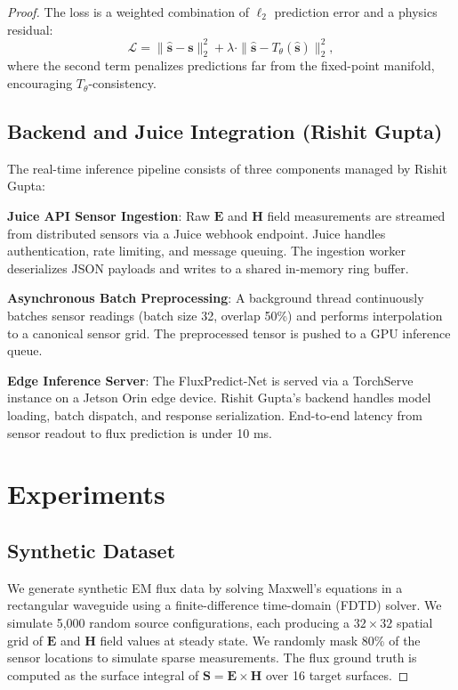 \documentclass[11pt]{article}
\begin{document}
\begin{proof}
The loss is a weighted combination of $\ell_2$ prediction error and a physics residual:
\begin{equation}
\mathcal{L} = \|\hat{\mathbf{s}} - \mathbf{s}\|_2^2 + \lambda \cdot \|\hat{\mathbf{s}} - T_\theta(\hat{\mathbf{s}})\|_2^2,
\label{eq:loss}
\end{equation}
where the second term penalizes predictions far from the fixed-point manifold, encouraging $T_\theta$-consistency.

\subsection{Backend and Juice Integration (Rishit Gupta)}

The real-time inference pipeline consists of three components managed by Rishit Gupta:

\textbf{Juice API Sensor Ingestion}: Raw $\mathbf{E}$ and $\mathbf{H}$ field measurements are streamed from distributed sensors via a Juice webhook endpoint. Juice handles authentication, rate limiting, and message queuing. The ingestion worker deserializes JSON payloads and writes to a shared in-memory ring buffer.

\textbf{Asynchronous Batch Preprocessing}: A background thread continuously batches sensor readings (batch size 32, overlap 50\%) and performs interpolation to a canonical sensor grid. The preprocessed tensor is pushed to a GPU inference queue.

\textbf{Edge Inference Server}: The FluxPredict-Net is served via a TorchServe instance on a Jetson Orin edge device. Rishit Gupta's backend handles model loading, batch dispatch, and response serialization. End-to-end latency from sensor readout to flux prediction is under 10 ms.

\section{Experiments}

\subsection{Synthetic Dataset}

We generate synthetic EM flux data by solving Maxwell's equations in a rectangular waveguide using a finite-difference time-domain (FDTD) solver. We simulate 5,000 random source configurations, each producing a $32 \times 32$ spatial grid of $\mathbf{E}$ and $\mathbf{H}$ field values at steady state. We randomly mask 80\% of the sensor locations to simulate sparse measurements. The flux ground truth is computed as the surface integral of $\mathbf{S} = \mathbf{E} \times \mathbf{H}$ over 16 target surfaces.


\end{proof}
\end{document}
